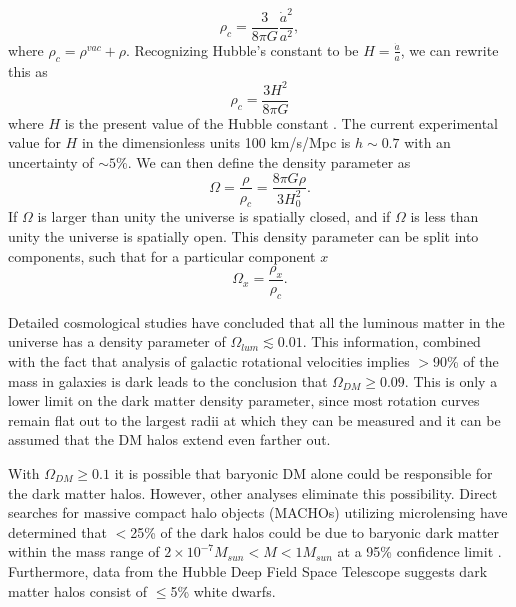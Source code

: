 \documentclass[a4paper,12pt]{article}
\begin{document}
\begin{equation}\label{RhoC}
\rho_c = \frac{3}{8 \pi G}\frac{\dot{a}^2}{a^2},
\end{equation}
where $\rho_c = \rho^{vac}+\rho$.
Recognizing Hubble's constant to be $ H = \frac { \dot{a}}{a} $, we can rewrite this as
\begin{equation}\label{RhoC2}
\rho_c =\frac{3H^2}{8 \pi G}
\end{equation}
where $H$ is the present value of the Hubble constant \cite{Javorsek}. The current experimental value for $H$ in the dimensionless units 100 km/s/Mpc is $ h \sim 0.7 $ with an uncertainty of $\sim5\%$.  We can then define the density parameter as 
\begin{equation} \label{Omega}
\Omega=\frac{\rho}{\rho_c}=\frac{8 \pi G \rho}{3 H_0^2}.
\end{equation}
If $\Omega$ is larger than unity the universe is spatially closed, and if $\Omega$ is less than unity the universe is spatially open. This density parameter can be split into components, such that for a particular component $x$
\begin{equation} \label{OmegaComp}
\Omega_x = \frac{\rho_x}{\rho_c}.
\end{equation}

Detailed cosmological studies have concluded that all the luminous matter in the universe has a density parameter of $\Omega_{lum} \lesssim 0.01$.  This information, combined  with the fact that analysis of galactic rotational velocities implies $> $90\% of the mass in galaxies is dark leads to the conclusion that $\Omega_{DM} \geq 0.09$.  This is only a lower limit on the dark matter density parameter, since most rotation curves remain flat out to the largest radii at which they can be measured and it can be assumed that the DM halos extend even farther out.


With $\Omega_{DM} \geq 0.1$ it is possible that baryonic DM alone could be responsible for the dark matter halos.  However, other analyses eliminate this possibility. Direct searches for massive compact halo objects (MACHOs) utilizing microlensing have determined that $<$25\% of the dark halos could be due to baryonic dark matter within the mass range of $ 2 \times 10^{-7} M_{sun} < M < 1 M_{sun} $ at a 95\% confidence limit \cite{EROS,Alcock}. Furthermore, data from the Hubble Deep Field Space Telescope suggests dark matter halos consist of $\leq$5\% white dwarfs.
\end{document}

